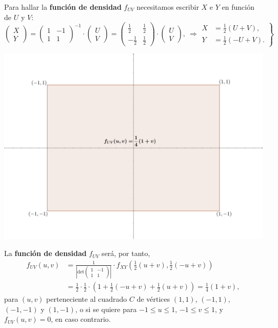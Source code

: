 \documentclass[]{book}
\begin{document}
Para hallar la \textbf{función de densidad} \(f_{UV}\) necesitamos escribir \(X\) e \(Y\) en función de \(U\) y \(V\):
\[
\begin{pmatrix}X\\ Y\end{pmatrix}=\begin{pmatrix}1 & -1\\ 1& 1\end{pmatrix}^{-1}\cdot\begin{pmatrix}U\\ V\end{pmatrix}=\begin{pmatrix}\frac{1}{2} & \frac{1}{2}\\ -\frac{1}{2}& \frac{1}{2}\end{pmatrix}\cdot\begin{pmatrix}U\\ V\end{pmatrix},\ \Rightarrow \left.\begin{array}{rl}X & = \frac{1}{2}(U+V),\\ Y & =\frac{1}{2}(-U+V).\end{array}\right\}
\]

\includegraphics{Images/EjTranLineal2.png}

La \textbf{función de densidad} \(f_{UV}\) será, por tanto,
\[
\begin{array}{rl}
f_{UV}(u,v) & =\frac{1}{\left|\mathrm{det}\begin{pmatrix}1 & -1\\ 1& 1\end{pmatrix}\right|}\cdot f_{XY}\left(\frac{1}{2}(u+v),\frac{1}{2}(-u+v)\right) \\ & =\frac{1}{2}\cdot \frac{1}{2}\cdot \left(1+\frac{1}{2}(-u+v)+\frac{1}{2}(u+v)\right)=\frac{1}{4}(1+v),
\end{array}
\]
para \((u,v)\) perteneciente al cuadrado \(C\) de vértices \((1,1)\), \((-1,1)\), \((-1,-1)\) y \((1,-1)\), o si se quiere para \(-1\leq u\leq 1\), \(-1\leq v\leq 1\), y \(f_{UV}(u,v)=0\), en caso contrario.
\end{document}
